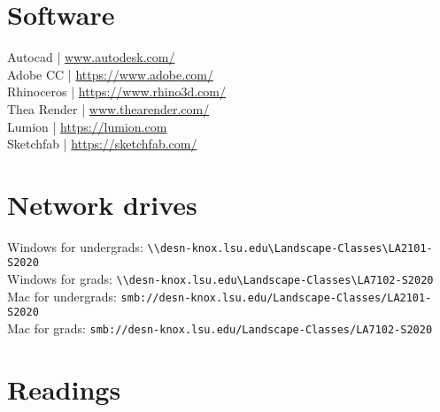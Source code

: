 \documentclass[11pt,article,oneside]{memoir}
\begin{document}
\clearpage

\section{Software}
\begin{multicols}{2}
\raggedright
Autocad | \url{www.autodesk.com/‎}\\
Adobe CC | \url{https://www.adobe.com/}\\
Rhinoceros | \url{https://www.rhino3d.com/}\\
Thea Render | \url{www.thearender.com/}\\
Lumion | \url{https://lumion.com}\\
Sketchfab | \url{https://sketchfab.com/}\\
\end{multicols}

\section{Network drives}


\noindent
Windows for undergrads: \verb|\\desn-knox.lsu.edu\Landscape-Classes\LA2101-S2020| \\
Windows for grads: \verb|\\desn-knox.lsu.edu\Landscape-Classes\LA7102-S2020| \\

\noindent
Mac for undergrads: \verb|smb://desn-knox.lsu.edu/Landscape-Classes/LA2101-S2020| \\
Mac for grads: \verb|smb://desn-knox.lsu.edu/Landscape-Classes/LA7102-S2020| \\

\section{Readings}
\vspace*{0.5cm}
\nocite{*}
\setlength{}
\printbibliography[heading=none]

\clearpage

\end{document}
